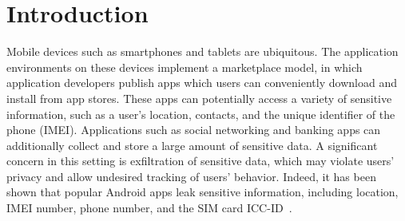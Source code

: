 \def\ttt{\texttt}
\def\trm{\textrm}
\def\tbf{\textbf}
\def\tsf{\textsf}

\newcommand{\itc}[1]{\textit{\it #1\/}}
\newcommand{\tup}[1]{\langle #1 \rangle}
\newcommand{\qt}[1]{\textrm{``}#1\textrm{''}}

\def\ttob{\texttt{\symbol{`\{}}}
\def\ttcb{\texttt{\symbol{`\}}}}
\newcommand{\ttc}[1]{\ttob{#1}\ttcb}

\newcommand{\src}{\ensuremath{\mathit{src}}}
\newcommand{\sink}{\ensuremath{\mathit{sink}}}
\newcommand{\TODO}[1]{\textcolor{red}{\tbf{TODO:} #1}}
\newcommand{\notes}[1]{\textcolor{red}{#1}}
\newcommand{\lujo}[1]{\notes{$\stackrel{\hbox{\tiny Lujo}}{\hbox{\tiny
        says}}$: #1}}
\newcommand{\limin}[1]{\notes{$\stackrel{\hbox{\tiny Limin}}{\hbox{\tiny says}}$: #1}}
\newcommand{\wek}[1]{\notes{$\stackrel{\hbox{\tiny Will}}{\hbox{\tiny says}}$: #1}}

\def\lxor{\oplus}
\def\impl{\Rightarrow}
\def\bicond{\Leftrightarrow}

\def\True{\ttt{true}}
\def\False{\ttt{false}}
\def\ds{\displaystyle}

\nonfrenchspacing





\chapter{Introduction} 
\label{sec:introduction}
Mobile devices such as smartphones and tablets are 
ubiquitous. The application environments on these devices implement
a marketplace model, in which application developers publish
apps which users can conveniently download and install
from app stores. These apps can
potentially access a variety of sensitive information, such as
a user's location, contacts, and the unique identifier of the
phone (IMEI). Applications such as social networking and banking
apps can additionally collect and store a large amount of sensitive
data. A significant concern in this setting is exfiltration of
sensitive data, which may violate
users' privacy and allow undesired tracking of users' behavior. 
Indeed, it has been shown that popular Android apps leak sensitive information, including location, IMEI number, phone number, and the SIM card ICC-ID~\cite{enck2010taintdroid}. 

